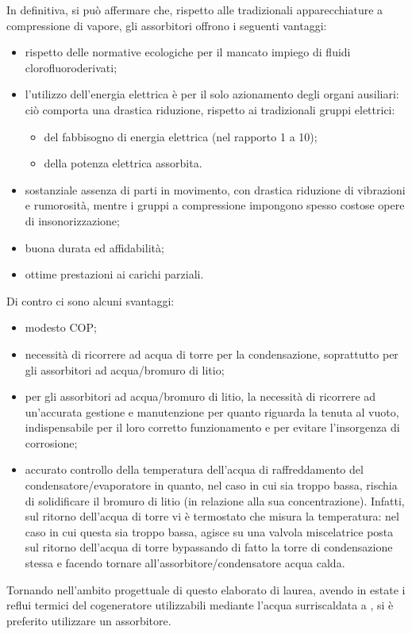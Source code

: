 In definitiva, si può affermare che, rispetto alle tradizionali apparecchiature a compressione di vapore, gli assorbitori offrono i seguenti vantaggi:
\begin{itemize}
	\item rispetto delle normative ecologiche per il mancato impiego di fluidi clorofluoroderivati;
	\item l'utilizzo dell'energia elettrica è per il solo azionamento degli organi ausiliari: ciò comporta una drastica riduzione, rispetto ai tradizionali gruppi elettrici:
	\begin{itemize}
		\item del fabbisogno di energia elettrica (nel rapporto \num{1} a \num{10});
		\item della potenza elettrica assorbita.
	\end{itemize}
	\item sostanziale assenza di parti in movimento, con drastica riduzione di vibrazioni e rumorosità, mentre i gruppi a compressione impongono spesso costose opere di insonorizzazione;
	\item buona durata ed affidabilità;
	\item ottime prestazioni ai carichi parziali.
\end{itemize}
Di contro ci sono alcuni svantaggi:
\begin{itemize}
	\item modesto COP;
	\item necessità di ricorrere ad acqua di torre per la condensazione, soprattutto per gli assorbitori ad acqua/bromuro di litio;
	\item per gli assorbitori ad acqua/bromuro di litio, la necessità di ricorrere ad un'accurata gestione e manutenzione per quanto riguarda la tenuta al vuoto, indispensabile per il loro corretto funzionamento e per evitare l'insorgenza di corrosione;
	\item accurato controllo della temperatura dell'acqua di raffreddamento del condensatore/evaporatore in quanto, nel caso in cui sia troppo bassa, rischia di solidificare il bromuro di litio (in relazione alla sua concentrazione). Infatti, sul ritorno dell'acqua di torre vi è termostato che misura la temperatura: nel caso in cui questa sia troppo bassa, agisce su una valvola miscelatrice posta sul ritorno dell'acqua di torre bypassando di fatto la torre di condensazione stessa e facendo tornare all'assorbitore/condensatore acqua calda.
\end{itemize}
Tornando nell'ambito progettuale di questo elaborato di laurea, avendo in estate i reflui termici del cogeneratore utilizzabili mediante l'acqua surriscaldata a , si è preferito utilizzare un assorbitore.

